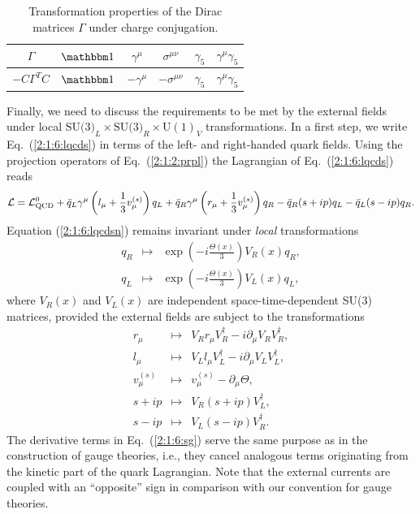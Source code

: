 \documentclass[twoside,12pt]{article}
\begin{document}
\begin{table}[t]
\begin{center}
\renewcommand{\arraystretch}{1.5}
\begin{tabular}{|c|c|c|c|c|c|}
\hline
$\Gamma$&$\mathbbm 1$&$\gamma^\mu$&$\sigma^{\mu\nu}$&$\gamma_5$&$\gamma^\mu\gamma_5$\\
\hline
$-C\Gamma^TC
$&$\mathbbm 1$&$-\gamma^\mu$&$-\sigma^{\mu\nu}$&$\gamma_5$&$\gamma^\mu\gamma_5$
\\
\hline
\end{tabular}
\end{center}
\caption{\label{2:1:6:chargeconjugation}
Transformation properties of the Dirac matrices $\Gamma$
under charge conjugation.}
\end{table}

   Finally, we need to discuss the requirements to be met by the external
fields under local $\mbox{SU(3)}_L\times\mbox{SU(3)}_R\times\mbox{U}(1)_V$
transformations.
   In a first step, we write Eq.\ (\ref{2:1:6:lqcds}) in terms of the
left- and right-handed quark fields.
   Using the projection operators of Eq.~(\ref{2:1:2:prpl}) the Lagrangian
of Eq.~(\ref{2:1:6:lqcds}) reads
\begin{equation}
\label{2:1:6:lqcdsn}
{\cal L}={\cal L}_{\rm QCD}^0
+\bar{q}_L\gamma^\mu\left(l_\mu+\frac{1}{3}v^{(s)}_\mu\right)q_L
+\bar{q}_R\gamma^\mu\left(r_\mu+\frac{1}{3}v^{(s)}_\mu\right)q_R-\bar{q}_R(s+ip)q_L-\bar{q}_L(s-ip)q_R.
\end{equation}
   Equation (\ref{2:1:6:lqcdsn}) remains invariant under {\em local}
transformations
\begin{eqnarray}
\label{2:1:6:qrl}
q_R&\mapsto&\exp\left(-i\frac{\Theta(x)}{3}\right) V_R(x) q_R,\nonumber\\
q_L&\mapsto&\exp\left(-i\frac{\Theta(x)}{3}\right) V_L(x) q_L,
\end{eqnarray}
where $V_R(x)$ and $V_L(x)$ are independent space-time-dependent SU(3)
matrices, provided the external fields are subject
to the transformations
\begin{eqnarray}
\label{2:1:6:sg}
r_\mu&\mapsto& V_R r_\mu V_R^{\dagger}
-i \partial_\mu V_R V_R^{\dagger},\nonumber\\
l_\mu&\mapsto& V_L l_\mu V_L^{\dagger}
-i\partial_\mu V_L V_L^{\dagger},
\nonumber\\
v_\mu^{(s)}&\mapsto&v_\mu^{(s)}-\partial_\mu\Theta,\nonumber\\
s+ip&\mapsto& V_R(s+ip)V_L^{\dagger},\nonumber\\
s-ip&\mapsto& V_L(s-ip)V_R^{\dagger}.
\end{eqnarray}
   The derivative terms in Eq.\ (\ref{2:1:6:sg}) serve the same purpose as
in the construction of gauge theories, i.e., they cancel analogous
terms originating from the kinetic part of the quark Lagrangian.
   Note that the external currents are coupled with an ``opposite'' sign in comparison
with our convention for gauge theories.
\end{document}
